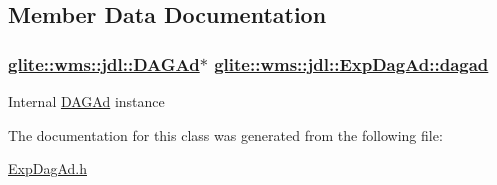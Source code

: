 \subsection{Member Data Documentation}
\hypertarget{classglite_1_1wms_1_1jdl_1_1ExpDagAd_p0}{
\subsubsection[dagad]{\setlength{\rightskip}{0pt plus 5cm}\hyperlink{classglite_1_1wms_1_1jdl_1_1DAGAd}{glite::wms::jdl::DAGAd}$\ast$ \hyperlink{classglite_1_1wms_1_1jdl_1_1ExpDagAd_p0}{glite::wms::jdl::Exp\-Dag\-Ad::dagad}}}
\label{classglite_1_1wms_1_1jdl_1_1ExpDagAd_p0}


Internal \hyperlink{classglite_1_1wms_1_1jdl_1_1DAGAd}{DAGAd} instance 

The documentation for this class was generated from the following file:\begin{CompactItemize}
\item 
\hyperlink{ExpDagAd_8h}{Exp\-Dag\-Ad.h}\end{CompactItemize}
